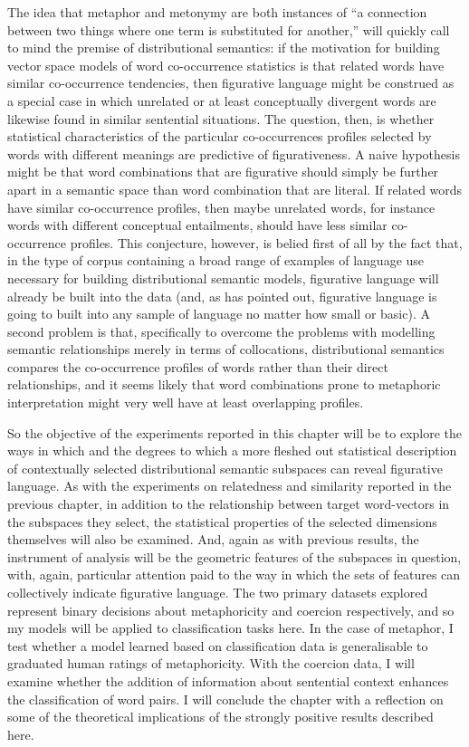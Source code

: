 The idea that metaphor and metonymy are both instances of ``a connection between two things where one term is substituted for another,'' \citep[][p. 260]{Gibbs1993} will quickly call to mind the premise of distributional semantics: if the motivation for building vector space models of word co-occurrence statistics is that related words have similar co-occurrence tendencies, then figurative language might be construed as a special case in which unrelated or at least conceptually divergent words are likewise found in similar sentential situations.  The question, then, is whether statistical characteristics of the particular co-occurrences profiles selected by words with different meanings are predictive of figurativeness.  A naive hypothesis might be that word combinations that are figurative should simply be further apart in a semantic space than word combination that are literal.  If related words have similar co-occurrence profiles, then maybe unrelated words, for instance words with different conceptual entailments, should have less similar co-occurrence profiles.  This conjecture, however, is belied first of all by the fact that, in the type of corpus containing a broad range of examples of language use necessary for building distributional semantic models, figurative language will already be built into the data (and, as \cite{Gibbs1994} has pointed out, figurative language is going to built into any sample of language no matter how small or basic).  A second problem is that, specifically to overcome the problems with modelling semantic relationships merely in terms of collocations, distributional semantics compares the co-occurrence profiles of words rather than their direct relationships, and it seems likely that word combinations prone to metaphoric interpretation might very well have at least overlapping profiles.

So the objective of the experiments reported in this chapter will be to explore the ways in which and the degrees to which a more fleshed out statistical description of contextually selected distributional semantic subspaces can reveal figurative language.  As with the experiments on relatedness and similarity reported in the previous chapter, in addition to the relationship between target word-vectors in the subspaces they select, the statistical properties of the selected dimensions themselves will also be examined.  And, again as with previous results, the instrument of analysis will be the geometric features of the subspaces in question, with, again, particular attention paid to the way in which the sets of features can collectively indicate figurative language.  The two primary datasets explored represent binary decisions about metaphoricity and coercion respectively, and so my models will be applied to classification tasks here.  In the case of metaphor, I test whether a model learned based on classification data is generalisable to graduated human ratings of metaphoricity.  With the coercion data, I will examine whether the addition of information about sentential context enhances the classification of word pairs.  I will conclude the chapter with a reflection on some of the theoretical implications of the strongly positive results described here.


